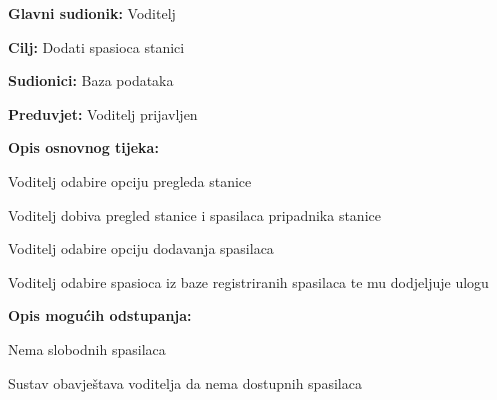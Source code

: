 					\noindent {}
					\begin{packed_item}
	
						\item \textbf{Glavni sudionik: }\text Voditelj
						\item  \textbf{Cilj:} \text Dodati spasioca stanici
						\item  \textbf{Sudionici:} \text Baza podataka
						\item  \textbf{Preduvjet:} \text Voditelj prijavljen
						\item  \textbf{Opis osnovnog tijeka:}
						
						\item[] \begin{packed_enum}
	
							\item \text Voditelj odabire opciju pregleda stanice
							\item \text Voditelj dobiva pregled stanice i spasilaca pripadnika stanice
							\item \text Voditelj odabire opciju dodavanja spasilaca
							\item \text Voditelj odabire spasioca iz baze registriranih spasilaca te mu dodjeljuje ulogu
					
						\end{packed_enum}

						\item  \textbf{Opis mogućih odstupanja:}
						
						\item[] \begin{packed_item}
	
							\item[4.a] \text Nema slobodnih spasilaca
							\item[] \begin{packed_item}
								
								\item \text Sustav obavještava voditelja da nema dostupnih spasilaca
								
							\end{packed_item}
							
						\end{packed_item}
						
					\end{packed_item}

